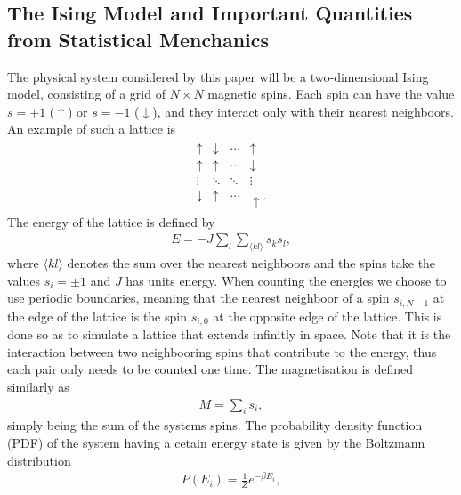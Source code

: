 \documentclass[twocolumn]{aastex62}
\begin{document}
\subsection{The Ising Model and Important Quantities from Statistical Menchanics} \label{subsec:ising_model}
The physical system considered by this paper will be a two-dimensional Ising
model, consisting of a grid of $N\times N$ magnetic spins. Each spin can have
the value $s = +1$ ($\uparrow$) or $s = -1$ ($\downarrow$), and they interact only with their nearest neighboors. An
example of such a lattice is 
\begin{align}
	\begin{smallmatrix}
		\uparrow & \downarrow & \cdots &\uparrow \\
		\uparrow & \uparrow & \cdots & \downarrow \\
		\vdots & \ddots & \ddots & \vdots \\
		\downarrow & \uparrow & \cdots & \uparrow.
	\end{smallmatrix}
\end{align}
The energy of the lattice is defined by 
\begin{align}
	E = -J\sum_l\sum_{\langle kl\rangle} s_k s_l,
	\label{eq:energy}
\end{align}
where $\langle kl\rangle$ denotes the sum over the nearest neighboors and the
spins take the values $s_i = \pm 1$ and $J$ has units energy. When counting the
energies we choose to use periodic boundaries, meaning that the nearest
neighboor of a spin $s_{i,N-1}$ at the edge of the lattice is the spin $s_{i,0}$
at the opposite edge of the lattice. This is done so as to simulate a lattice
that extends infinitly in space. Note that it is the interaction between two
neighbooring spins that contribute to the energy, thus each pair only needs to
be counted one time.
The magnetisation is defined similarly as 
\begin{align}
	M = \sum_i s_i,	
	\label{eq:magnetisation}
\end{align} 
simply being the sum of the systems spins. The probability density function (PDF) of the system having
a cetain energy state is given by the Boltzmann distribution 
\begin{align}
	P(E_i) = \frac{1}{Z}e^{-\beta E_i},
\end{align}
\end{document}
